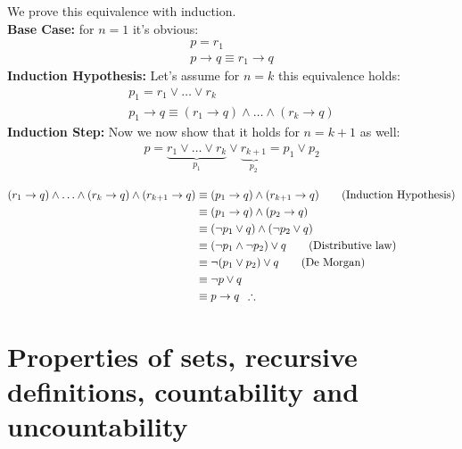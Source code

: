 \documentclass[11pt]{article}
\newcommand{\tab}[1][30pt]{\hspace*{#1}}
\begin{document}
\subsubsection{}
We prove this equivalence with induction.\\
\textbf{Base Case:} for $n=1$ it's obvious:
\begin{gather*}
p = r_1\\
p \to q \equiv r_1 \to q
\end{gather*}
\textbf{Induction Hypothesis:} Let's assume for $n=k$ this equivalence holds:
\begin{gather*}
    p_1 = r_1 \lor \ldots \lor r_k\\
    p_1 \to q \equiv (r_1\to q) \land \ldots \land (r_k\to q)
\end{gather*}
\textbf{Induction Step:} Now we now show that it holds for $n=k+1$ as well:
\begin{gather*}
p = \underbrace{r_1 \lor \ldots \lor r_k}_{p_1} \lor \underbrace{r_{k+1}}_{p_2} = p_1 \lor p_2\\
\end{gather*}
\begin{align*}
(r_1\to q) \land \ldots \land (r_k\to q) \land (r_{k+1}\to q)
&\equiv (p_1 \to q) \land (r_{k+1}\to q) \tag{Induction Hypothesis}
\\ &\equiv (p_1 \to q) \land (p_2\to q)
\\ &\equiv (\neg p_1 \lor q) \land (\neg p_2 \lor q)
\\ &\equiv (\neg p_1 \land \neg p_2) \lor q \tag{Distributive law}
\\ &\equiv \neg (p_1 \lor p_2) \lor q \tag{De Morgan}
\\ &\equiv \neg p \lor q
\\ &\equiv p \to q \tab[5pt] \therefore
\end{align*}

\section{Properties of sets, recursive definitions, countability and uncountability}
\end{document}
